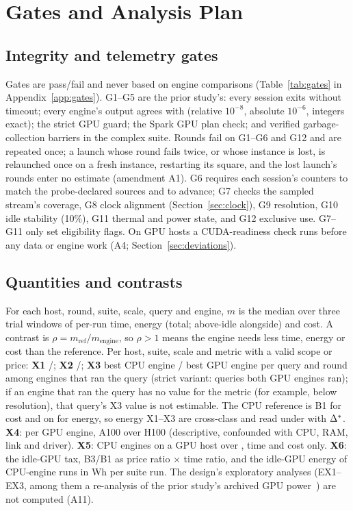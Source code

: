 \documentclass[sigconf]{acmart}
\begin{document}
\section{Gates and Analysis Plan}
\label{sec:analysis}

\subsection{Integrity and telemetry gates}
\label{sec:gates}
Gates are pass/fail and never based on engine comparisons (Table~\ref{tab:gates} in
Appendix~\ref{app:gates}). G1--G5 are
the prior study's: every session exits without timeout; every engine's output agrees with
\polarscpu{} (relative $10^{-8}$, absolute $10^{-6}$, integers exact); the strict GPU guard; the
Spark GPU plan check; and verified garbage-collection barriers in the complex suite. Rounds fail
on G1--G6 and G12 and are repeated once; a launch whose round fails twice, or whose instance is
lost, is relaunched once on a fresh instance, restarting its square, and the lost launch's rounds
enter no estimate (amendment A1). G6 requires each session's counters to match the
probe-declared sources and to advance; G7 checks the sampled stream's coverage, G8 clock alignment
(Section~\ref{sec:clock}), G9 resolution, G10 idle stability (10\%), G11 thermal and power state,
and G12 exclusive use. G7--G11 only set eligibility flags. On GPU hosts a
CUDA-readiness check runs before any data or engine work (A4; Section~\ref{sec:deviations}).

\subsection{Quantities and contrasts}
\label{sec:contrasts}
For each host, round, suite, scale, query and engine, $m$ is the median over three trial windows
of per-run time, energy (total; above-idle alongside) and cost. A contrast is
$\rho = m_{\mathrm{ref}}/m_{\mathrm{engine}}$, so $\rho > 1$ means the engine needs less time,
energy or cost than the reference. Per host, suite, scale and metric with a valid scope or price:
\textbf{X1} \polarscpu{}/\polarsgpu{}; \textbf{X2} \sparkcpu{}/\sparkgpu{}; \textbf{X3} best CPU
engine / best GPU engine per query and round among engines that ran the query (strict variant:
queries both GPU engines ran); if an engine that ran the query has no value for the metric (for
example, below resolution), that query's X3 value is not estimable. The CPU reference is B1 for cost and  on \CG{} for
energy, so energy X1--X3 are cross-class and read under \NOne{} with $\Delta^{*}$. \textbf{X4}: per GPU
engine, A100 over H100 (descriptive, confounded with CPU, RAM, link and driver). \textbf{X5}: CPU
engines on a GPU host over \CG{}, time and cost only. \textbf{X6}: the idle-GPU tax, B3/B1 as price
ratio $\times$ time ratio, and the  idle-GPU energy of CPU-engine runs in Wh per suite
run. The design's exploratory analyses (EX1--EX3, among them a re-analysis of the prior study's
archived GPU power~\cite{ejiofor2026rawp1}) are not computed (A11).
\end{document}
